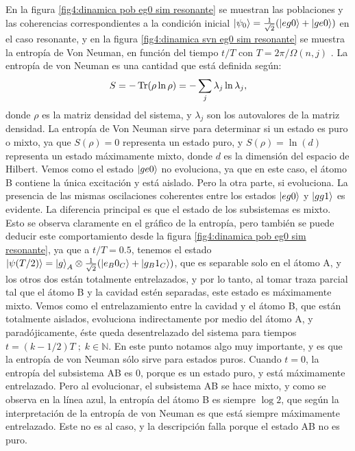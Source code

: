 En la figura \ref{fig4:dinamica pob eg0 sim resonante} se muestran las poblaciones y las coherencias correspondientes a la condición inicial $\ket{\psi_0}=\frac{1}{\sqrt{2}}(\ket{eg0} + \ket{ge0})$ en el caso resonante, y en la figura \ref{fig4:dinamica svn eg0 sim resonante} se muestra la entropía de Von Neuman, en función del tiempo $t/T$ con $T=2 \pi /\Omega(n,j)$  . La entropía de von Neuman es una cantidad que está definida según:
\begin{equation}\label{ec4:entropia von neuman}
    S=-\Tr(\rho \ln \rho)=-\sum_j \lambda_j \ln \lambda_j,
\end{equation}
donde $\rho$ es la matriz densidad del sistema, y $\lambda_j$ son los autovalores de la matriz densidad. La entropía de Von Neuman sirve para determinar si un estado es puro o mixto, ya que $S(\rho)=0$ representa un estado puro, y $S(\rho)=\ln(d)$ representa un estado máximamente mixto, donde $d$ es la dimensión del espacio de Hilbert.
Vemos como el estado $\ket{ge0}$ no evoluciona, ya que en este caso, el átomo B contiene la única excitación y está aislado. Pero la otra parte, si evoluciona. La presencia de las mismas oscilaciones coherentes entre los estados $\ket{eg0}$ y $\ket{gg1}$ es evidente. La diferencia principal es que el estado de los subsistemas es mixto. Esto se observa claramente en el gráfico de la entropía, pero también se puede deducir este comportamiento desde la figura \ref{fig4:dinamica pob eg0 sim resonante}, ya que a $t/T=0.5$, tenemos el estado $\ket{\psi(T/2)}=\ket{g}_A\otimes\frac{1}{\sqrt{2}}(\ket{e_B0_C}+\ket{g_B1_C})$, que es separable solo en el átomo A, y los otros dos están totalmente entrelazados, y por lo tanto, al tomar traza parcial tal que el átomo B y la cavidad estén separadas, este estado es máximamente mixto. Vemos como el entrelazamiento entre la cavidad y el átomo B, que están totalmente aislados, evoluciona indirectamente por medio del átomo A, y paradójicamente, éste queda desentrelazado del sistema para tiempos $t=(k-1/2)T\; ; \; k \in \mathbb{N}$. En este punto notamos algo muy importante, y es que la entropía de von Neuman sólo sirve para estados puros. Cuando $t=0$, la entropía del subsistema AB es 0, porque es un estado puro, y está máximamente entrelazado. Pero al evolucionar, el subsistema AB se hace mixto, y como se observa en la línea azul, la entropía del átomo B es siempre $\log 2$, que según la interpretación de la entropía de von Neuman es que está siempre máximamente entrelazado. Este no es al caso, y la descripción falla porque el estado AB no es puro.

